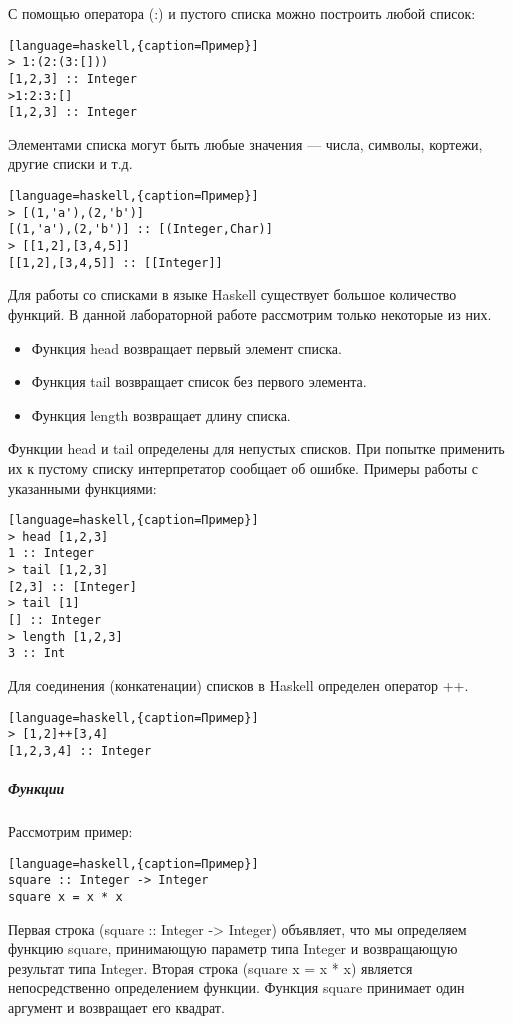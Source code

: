 \documentclass[a4paper,12pt]{article}
\begin{document}
С помощью оператора (:) и пустого списка можно построить любой список:
\begin{lstlisting}[language=haskell,{caption=Пример}]
> 1:(2:(3:[]))
[1,2,3] :: Integer
>1:2:3:[]
[1,2,3] :: Integer
\end{lstlisting}

Элементами списка могут быть любые значения — числа, символы, кортежи, другие списки и т.д.
\begin{lstlisting}[language=haskell,{caption=Пример}]
> [(1,'a'),(2,'b')]
[(1,'a'),(2,'b')] :: [(Integer,Char)]
> [[1,2],[3,4,5]]
[[1,2],[3,4,5]] :: [[Integer]]
\end{lstlisting}

Для работы со списками в языке Haskell существует большое количество функций. В данной лабораторной работе рассмотрим только некоторые из них.
\begin{itemize}
	\item Функция head возвращает первый элемент списка.
	\item Функция tail возвращает список без первого элемента.
	\item Функция length возвращает длину списка.
\end{itemize}
Функции head и tail определены для непустых списков. При попытке применить их к пустому списку интерпретатор сообщает об ошибке. Примеры работы с указанными функциями:

\begin{lstlisting}[language=haskell,{caption=Пример}]
> head [1,2,3]
1 :: Integer
> tail [1,2,3]
[2,3] :: [Integer]
> tail [1]
[] :: Integer
> length [1,2,3]
3 :: Int
\end{lstlisting}

Для соединения (конкатенации) списков в Haskell определен оператор ++.
\begin{lstlisting}[language=haskell,{caption=Пример}]
> [1,2]++[3,4]
[1,2,3,4] :: Integer
\end{lstlisting}

\subparagraph{Функции} Рассмотрим пример:

\begin{lstlisting}[language=haskell,{caption=Пример}]
square :: Integer -> Integer
square x = x * x
\end{lstlisting}
Первая строка (square :: Integer -> Integer) объявляет, что мы определяем функцию square, принимающую параметр типа Integer и возвращающую результат типа Integer. Вторая строка (square x = x * x) является непосредственно определением функции. Функция square принимает один аргумент и возвращает его квадрат.
\end{document}
